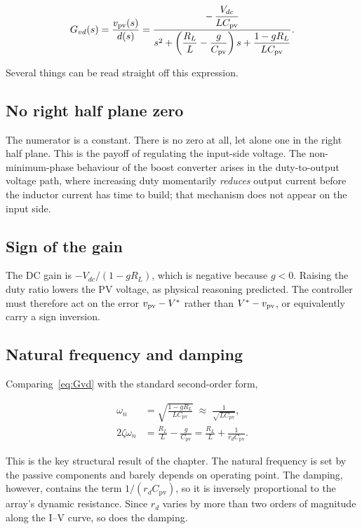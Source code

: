 \begin{equation}
G_{vd}(s) = \frac{v_{\mathrm{pv}}(s)}{d(s)}
= \frac{-\,\dfrac{V_{dc}}{L C_{\mathrm{pv}}}}
       {s^2 + \left(\dfrac{R_L}{L} - \dfrac{g}{C_{\mathrm{pv}}}\right)s
        + \dfrac{1 - g R_L}{L C_{\mathrm{pv}}}} .
\label{eq:Gvd}
\end{equation}

Several things can be read straight off this expression.

\subsection{No right half plane zero}

The numerator is a constant. There is no zero at all, let alone one in the right
half plane. This is the payoff of regulating the input-side voltage. The
non-minimum-phase behaviour of the boost converter arises in the duty-to-output
voltage path, where increasing duty momentarily \emph{reduces} output current
before the inductor current has time to build; that mechanism does not appear on
the input side.

\subsection{Sign of the gain}

The DC gain is $-V_{dc}/(1 - g R_L)$, which is negative because $g < 0$. Raising
the duty ratio lowers the PV voltage, as physical reasoning predicted. The
controller must therefore act on the error $v_{\mathrm{pv}} - V^\ast$ rather than
$V^\ast - v_{\mathrm{pv}}$, or equivalently carry a sign inversion.

\subsection{Natural frequency and damping}

Comparing~\eqref{eq:Gvd} with the standard second-order form,

\begin{align}
\omega_n &= \sqrt{\frac{1 - g R_L}{L C_{\mathrm{pv}}}} \;\approx\; \frac{1}{\sqrt{L C_{\mathrm{pv}}}}, \label{eq:wn}\\
2\zeta\omega_n &= \frac{R_L}{L} - \frac{g}{C_{\mathrm{pv}}} = \frac{R_L}{L} + \frac{1}{r_d C_{\mathrm{pv}}}. \label{eq:zeta}
\end{align}

This is the key structural result of the chapter. The natural frequency is set
by the passive components and barely depends on operating point. The damping,
however, contains the term $1/(r_d C_{\mathrm{pv}})$, so it is inversely
proportional to the array's dynamic resistance. Since $r_d$ varies by more than
two orders of magnitude along the I--V curve, so does the damping.

